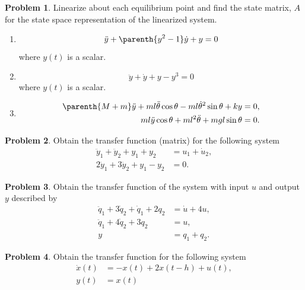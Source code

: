 \documentclass[10pt]{article}
\theoremstyle{definition}
\newtheorem{prob}{Problem}[section]
\newenvironment{subprob}%
{\renewcommand{\theenumi}{\alph{enumi}}\renewcommand{\labelenumi}{(\theenumi)}\begin{enumerate}}%
{\end{enumerate}}%
\begin{document}
\begin{prob}
    Linearize about each equilibrium point and find the state matrix, \( A \) for the state space representation of the linearized system.

    \begin{subprob}
        \item \[ \ddot y + \parenth{y^2 - 1} \dot y + y = 0\] where \( y(t) \) is a scalar.
        \item \[ \ddot y + \dot y + y - y^3 = 0 \] where \( y(t) \) is a scalar.
        \item \begin{align*}
                \parenth{M + m} \ddot y + ml \ddot \theta \cos \theta - ml \dot \theta^2 \sin \theta + ky &= 0, \\
                m l \ddot y \cos \theta + ml^2 \ddot \theta + m g l \sin \theta &=0.
            \end{align*}
    
    \end{subprob}
\end{prob}

\begin{prob}
    Obtain the transfer function (matrix) for the following system
    \begin{align*}
        \ddot y_1 + \ddot y_2 + y_1 + y_2 &=  u_1 + \dot u_2 , \\
        2 \ddot y_1 + 3 \ddot y_2 + y_1 - y_2 &= 0 .
    \end{align*}
\end{prob}

\begin{prob}
    Obtain the transfer function of the system with input \( u \) and output \( y \) described by
    \begin{align*}
        \ddot q_1 + 3 \dot q_2 + \dot q_1 + 2 q_2 &= \dot u + 4 u , \\
        \ddot q_1 + 4 \dot q_2 + 3 q_2 &= u , \\
        y & =  q_1 + q_2.
    \end{align*}
\end{prob}

\begin{prob}
    Obtain the transfer function for the following system
    \begin{align*}
        \dot x(t) &= - x(t) + 2 x(t-h) + u(t) , \\
        y(t) &= x(t)
    \end{align*}
\end{prob}
\end{document}
